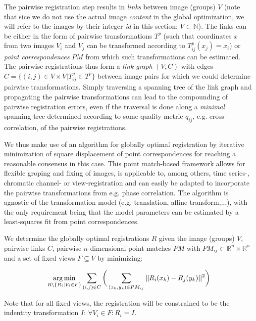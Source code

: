 The pairwise registration step results in \emph{links} between image (groups) $V$ (note that sice we do not use the actual image \emph{content} in the global optimization, we will refer to the images by their integer \emph{id} in this section: $V \subset \mathbb{N}$). The links can be either in the form of pairwise transformations $T^{p}$  (such that coordinates $x$ from two images $V_i$ and $V_j$ can be transformed according to $T^p_{ij} (x_{j}) = x_i$) or \emph{point correspondences} $PM$ from which such transformations can be estimated.
The pairwise registrations thus form a \emph{link graph} $(V, C)$ with edges $C = \{(i,j) \in V \times V | T^p_{ij} \in T^p \}$ between image pairs for which we could determine pairwise transformations. Simply traversing a spanning tree of the link graph and propagating the pairwise transformations can lead to the compounding of pairwise registration errors, even if the traversal is done along a \emph{minimal} spanning tree determined according to some quality metric $q_{ij}$, e.g. cross-correlation, of the pairwise registrations.

We thus make use of an algorithm for globally optimal registration by iterative minimization of square displacement of point correspondences\cite{saalfeld2010rigid} for reaching a reasonable consensus in this case. This point match-based framework allows for flexible groping and fixing of images, is applicable to, among others, time series-, chromatic channel- or view-registration and can easily be adapted to incorporate the pairwise transformations from e.g. phase correlation. The algorithm is agnostic of the transformation model (e.g. translation, affine transform,...), with the only requirement being that the model parameters can be estimated by a least-squares fit from point correspondences.

We determine the globally optimal registrations $R$ given the image (groups) $V$, pairwise links $C$, pairwise $n$-dimensional point matches $PM$ with $PM_{ij} \subset \mathbb{R}^n \times  \mathbb{R}^n$ and a set of fixed views $F \subseteq V$ by minimizing:

\begin{equation}
\label{eq:globalopt-eq1}
\operatorname*{arg\,min}_{R \setminus \{R_i | V_i \in F\}} \sum_{(i,j) \in C} \bigg( \sum_{(x_{k}, y_{k}) \in PM_{ij}} || R_{i}( x_{k}) - R_{j}( y_{k}) ||^2 \bigg)
\end{equation}

Note that for all fixed views, the registration will be constrained to be the indentity transformation $I$: $\forall V_i \in F: R_{i} = I$.


